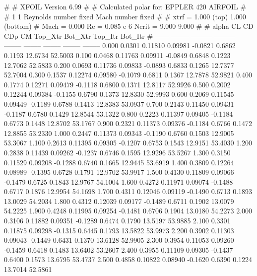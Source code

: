 #  
#       XFOIL         Version 6.99
#  
# Calculated polar for: EPPLER 420 AIRFOIL                              
#  
# 1 1 Reynolds number fixed          Mach number fixed         
#  
# xtrf =   1.000 (top)        1.000 (bottom)  
# Mach =   0.000     Re =     0.085 e 6     Ncrit =   9.000  9.000
#  
#   alpha    CL        CD       CDp       CM     Top_Xtr  Bot_Xtr  Top_Itr  Bot_Itr
#  ------ -------- --------- --------- -------- -------- -------- -------- --------
   0.000   0.0301   0.11810   0.09981  -0.0821   0.6862   0.1193  12.6734  52.5003
   0.100   0.0468   0.11763   0.09911  -0.0849   0.6848   0.1223  12.7062  52.5833
   0.200   0.0693   0.11736   0.09833  -0.0893   0.6833   0.1265  12.7377  52.7004
   0.300   0.1537   0.12274   0.09580  -0.1079   0.6811   0.1367  12.7878  52.9821
   0.400   0.1774   0.12271   0.09479  -0.1118   0.6800   0.1371  12.8117  52.9926
   0.500   0.2002   0.12244   0.09384  -0.1155   0.6790   0.1373  12.8330  52.9993
   0.600   0.2069   0.11545   0.09449  -0.1189   0.6788   0.1413  12.8383  53.0937
   0.700   0.2143   0.11450   0.09431  -0.1187   0.6780   0.1429  12.8544  53.1322
   0.800   0.2223   0.11397   0.09405  -0.1184   0.6773   0.1448  12.8702  53.1767
   0.900   0.2321   0.11373   0.09376  -0.1184   0.6766   0.1472  12.8855  53.2330
   1.000   0.2447   0.11373   0.09343  -0.1190   0.6760   0.1503  12.9005  53.3067
   1.100   0.2613   0.11395   0.09305  -0.1207   0.6753   0.1543  12.9151  53.4030
   1.200   0.2838   0.11439   0.09262  -0.1237   0.6746   0.1595  12.9296  53.5267
   1.300   0.3150   0.11529   0.09208  -0.1288   0.6740   0.1665  12.9445  53.6919
   1.400   0.3809   0.12264   0.08989  -0.1395   0.6728   0.1791  12.9702  53.9917
   1.500   0.4130   0.11809   0.09066  -0.1479   0.6725   0.1843  12.9767  54.1004
   1.600   0.4272   0.11971   0.09074  -0.1488   0.6717   0.1876  12.9954  54.1698
   1.700   0.4311   0.12046   0.09119  -0.1490   0.6713   0.1893  13.0029  54.2034
   1.800   0.4312   0.12039   0.09177  -0.1489   0.6711   0.1902  13.0079  54.2225
   1.900   0.4248   0.11995   0.09254  -0.1481   0.6706   0.1904  13.0180  54.2273
   2.000   0.3106   0.11882   0.09351  -0.1289   0.6474   0.1790  13.5197  53.9885
   2.100   0.3301   0.11875   0.09298  -0.1315   0.6445   0.1793  13.5822  53.9973
   2.200   0.3902   0.11303   0.09043  -0.1449   0.6431   0.1370  13.6128  52.9905
   2.300   0.3954   0.11053   0.09260  -0.1459   0.6418   0.1483  13.6402  53.2607
   2.400   0.3955   0.11109   0.09305  -0.1437   0.6400   0.1573  13.6795  53.4737
   2.500   0.4858   0.10822   0.08940  -0.1620   0.6390   0.1224  13.7014  52.5861
